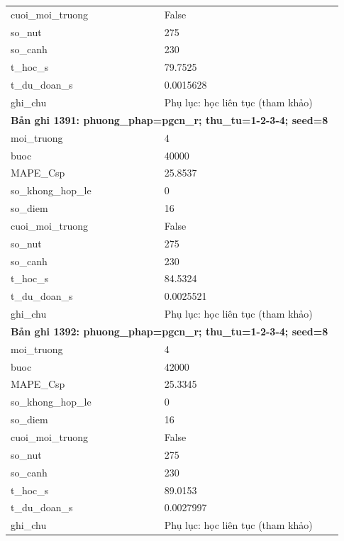 \begin{longtable}{p{0.43\linewidth}p{0.50\linewidth}}
cuoi\_\allowbreak moi\_\allowbreak truong & False \\
so\_\allowbreak nut & 275 \\
so\_\allowbreak canh & 230 \\
t\_\allowbreak hoc\_\allowbreak s & 79.7525 \\
t\_\allowbreak du\_\allowbreak doan\_\allowbreak s & 0.0015628 \\
ghi\_\allowbreak chu & Phụ lục: học liên tục (tham khảo) \\
\midrule
\multicolumn{2}{p{0.95\linewidth}}{\textbf{Bản ghi 1391: phuong\_phap=pgcn\_r; thu\_tu=1-2-3-4; seed=8}} \\
moi\_\allowbreak truong & 4 \\
buoc & 40000 \\
MAPE\_\allowbreak Csp & 25.8537 \\
so\_\allowbreak khong\_\allowbreak hop\_\allowbreak le & 0 \\
so\_\allowbreak diem & 16 \\
cuoi\_\allowbreak moi\_\allowbreak truong & False \\
so\_\allowbreak nut & 275 \\
so\_\allowbreak canh & 230 \\
t\_\allowbreak hoc\_\allowbreak s & 84.5324 \\
t\_\allowbreak du\_\allowbreak doan\_\allowbreak s & 0.0025521 \\
ghi\_\allowbreak chu & Phụ lục: học liên tục (tham khảo) \\
\midrule
\multicolumn{2}{p{0.95\linewidth}}{\textbf{Bản ghi 1392: phuong\_phap=pgcn\_r; thu\_tu=1-2-3-4; seed=8}} \\
moi\_\allowbreak truong & 4 \\
buoc & 42000 \\
MAPE\_\allowbreak Csp & 25.3345 \\
so\_\allowbreak khong\_\allowbreak hop\_\allowbreak le & 0 \\
so\_\allowbreak diem & 16 \\
cuoi\_\allowbreak moi\_\allowbreak truong & False \\
so\_\allowbreak nut & 275 \\
so\_\allowbreak canh & 230 \\
t\_\allowbreak hoc\_\allowbreak s & 89.0153 \\
t\_\allowbreak du\_\allowbreak doan\_\allowbreak s & 0.0027997 \\
ghi\_\allowbreak chu & Phụ lục: học liên tục (tham khảo) \\

\end{longtable}
